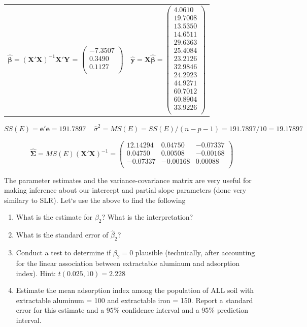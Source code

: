 \begin{center}
\begin{tabular}{cc}
$\hat{\boldsymbol{\beta}}= (\textbf{X}'\textbf{X})^{-1} \textbf{X}'\textbf{Y}$ = $\left(\begin{array}{cc} -7.3507\\  0.3490\\ 0.1127\\\end{array}\right)$&
$\hat{\textbf{y}} = \textbf{X}\hat{\boldsymbol{\beta}} = \left(\begin{array}{c}4.0610\\19.7008\\13.5350\\14.6511\\29.6363\\25.4084\\23.2126\\32.9846\\24.2923\\44.9271\\60.7012\\60.8904\\33.9226\\\end{array}\right)$
\end{tabular}
\end{center}

$$SS(E) = \textbf{e}'\textbf{e} = 191.7897 ~~~~~ \hat{\sigma}^2=MS(E) = SS(E)/(n-p-1) = 191.7897/10 = 19.17897 $$

$$\hat{\boldsymbol{\Sigma}}=MS(E)(\textbf{X}'\textbf{X})^{-1} = \left(\begin{array}{ccc}
 12.14294&  0.04750& -0.07337\\
 0.04750  &0.00508 &-0.00168\\
 -0.07337 &-0.00168&  0.00088\\
\end{array}\right)$$

\newpage

The parameter estimates and the variance-covariance matrix are very useful for making inference about our intercept and partial slope parameters (done very similary to SLR).  Let`s use the above to find the following
\begin{enumerate}
\item What is the estimate for $\beta_2$?  What is the interpretation?
\item What is the standard error of $\hat\beta_2$?  
\item Conduct a test to determine if $\beta_2=0$ plausible (technically, after accounting for the linear association between extractable aluminum and adsorption index).  Hint: $t(0.025, 10)=2.228$
\item Estimate the mean adsorption index among the population of ALL soil with extractable aluminum = 100 and extractable iron = 150.  Report a standard error for this estimate and a $95\%$ confidence interval and a 95\% prediction interval.
\end{enumerate}


